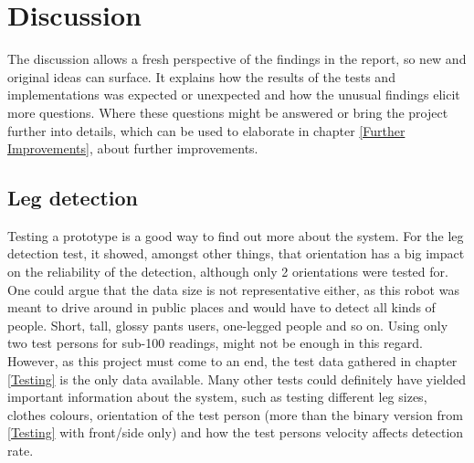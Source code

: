 \chapter{Discussion}\label{Discussion}

The discussion allows a fresh perspective of the findings in the report, so new and original ideas can surface. It explains how the results of the tests and implementations was expected or unexpected and how the unusual findings elicit more questions. Where these questions might be answered or bring the project further into details, which can be used to elaborate in chapter \ref{Further Improvements}, about further improvements.

\section{Leg detection}
Testing a prototype is a good way to find out more about the system. For the leg detection test, it showed, amongst other things, that orientation has a big impact on the reliability of the detection, although only 2 orientations were tested for. One could argue that the data size is not representative either, as this robot was meant to drive around in public places and would have to detect all kinds of people. Short, tall, glossy pants users, one-legged people and so on. Using only two test persons for sub-100 readings, might not be enough in this regard. However, as this project must come to an end, the test data gathered in chapter \ref{Testing} is the only data available. Many other tests could definitely have yielded important information about the system, such as testing different leg sizes, clothes colours, orientation of the test person (more than the binary version from \ref{Testing} with front/side only) and how the test persons velocity affects detection rate.

